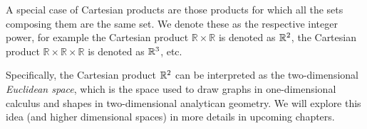 A special case of Cartesian products are those products for which all the sets composing them are the same set. We denote these as the respective integer power, for example the Cartesian product $\mathbb{R}\times\mathbb{R}$ is denoted as $\mathbb{R}^{2}$, the Cartesian product $\mathbb{R}\times\mathbb{R}\times\mathbb{R}$ is denoted as $\mathbb{R}^{3}$, etc.

Specifically, the Cartesian product $\mathbb{R}^{2}$ can be interpreted as the two-dimensional \emph{Euclidean space}, which is the space used to draw graphs in one-dimensional calculus and shapes in two-dimensional analytican geometry. We will explore this idea (and higher dimensional spaces) in more details in upcoming chapters.
